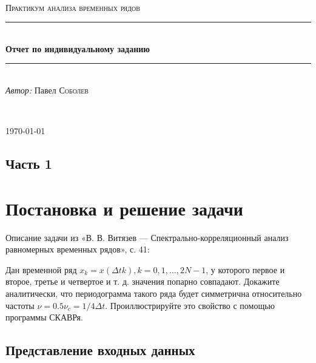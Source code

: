 \documentclass[12pt]{article}
\begin{document}
\begin{titlepage}

    \newcommand{\HRule}{\rule{\linewidth}{0.5mm}}
    
    \center

    \ \\[6.5cm]
    
    \textsc{\Large Практикум анализа временных рядов}\\[0.5cm]
    
    \HRule\\[0.4cm]
    
    {\huge\bfseries Отчет по индивидуальному заданию}\\[0.4cm]
    
    \HRule\\[0.5cm]
    
    \large
    \textit{Автор:} Павел \textsc{Соболев}
    
    \ \\[0.9cm]
    \vfill\vfill\vfill
    
    {\large\today}
    
    \vfill
    
\end{titlepage}

\subsection*{Часть 1}
\section*{Постановка и решение задачи}
\setcounter{section}{1}

\vspace{18pt}

Описание задачи из «В. В. Витязев — Спектрально-корреляционный анализ равномерных временных рядов», с. 41: \par

\vspace{\baselineskip}

Дан временной ряд $ x_k = x\left(\Delta t k\right), k = 0, 1, \ldots, 2N - 1 $, у которого первое и второе, третье и четвертое и т. д. значения попарно совпадают. Докажите аналитически, что периодограмма такого ряда будет симметрична относительно частоты $ \nu = 0.5 \nu_c = 1/4 \Delta t $. Проиллюстрируйте это свойство с помощью программы СКАВРя.

\subsection{Представление входных данных}
\end{document}
